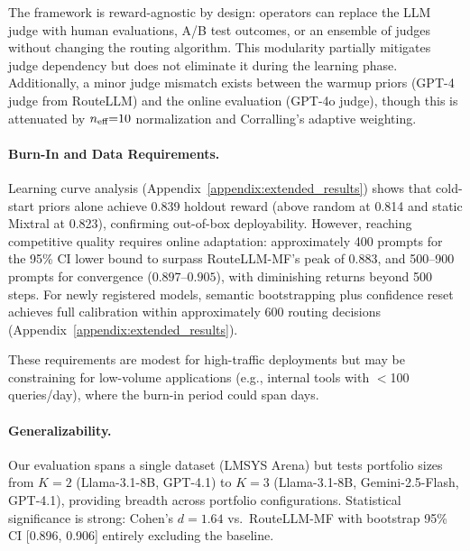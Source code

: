 The framework is reward-agnostic by design: operators can replace the LLM
judge with human evaluations, A/B test outcomes, or an ensemble of judges
without changing the routing algorithm.
This modularity partially mitigates judge dependency but does not eliminate it
during the learning phase.
Additionally, a minor judge mismatch exists between the warmup priors
(GPT-4 judge from RouteLLM) and the online evaluation (GPT-4o judge), though
this is attenuated by $n_{\text{eff}}{=}10$ normalization and Corralling's adaptive
weighting.

\paragraph{Burn-In and Data Requirements.}
Learning curve analysis
(Appendix~\ref{appendix:extended_results}) shows that cold-start
priors alone achieve 0.839 holdout reward (above random at 0.814 and static
Mixtral at 0.823), confirming out-of-box deployability.
However, reaching competitive quality requires online adaptation:
approximately 400 prompts for the 95\% CI lower bound to surpass RouteLLM-MF's peak of 0.883,
and 500--900 prompts for convergence ($0.897$--$0.905$), with diminishing
returns beyond 500 steps.
For newly registered models, semantic bootstrapping plus confidence reset
achieves full calibration within approximately 600 routing decisions
(Appendix~\ref{appendix:extended_results}).

These requirements are modest for high-traffic deployments but may be
constraining for low-volume applications (e.g., internal tools with
$<$100 queries/day), where the burn-in period could span days.

\paragraph{Generalizability.}
Our evaluation spans a single dataset (LMSYS Arena) but tests portfolio sizes
from $K{=}2$ (Llama-3.1-8B, GPT-4.1) to $K{=}3$
(Llama-3.1-8B, Gemini-2.5-Flash, GPT-4.1), providing breadth across
portfolio configurations.
Statistical significance is strong: Cohen's $d{=}1.64$ vs.\ RouteLLM-MF
with bootstrap 95\% CI [0.896, 0.906] entirely excluding the baseline.

